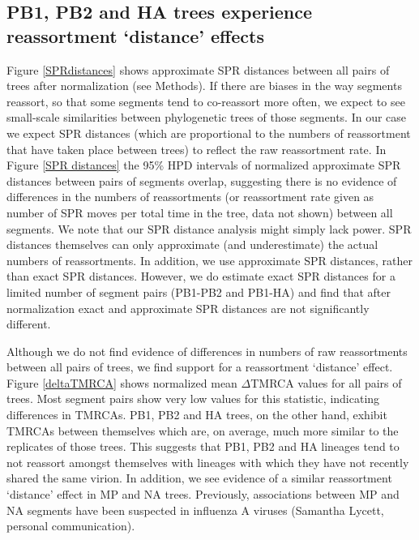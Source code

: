 \documentclass[11pt,oneside,letterpaper]{article}
\begin{document}
\subsection*{PB1, PB2 and HA trees experience reassortment `distance' effects}
Figure \ref{SPRdistances} shows approximate SPR distances between all pairs of trees after normalization (see Methods).
If there are biases in the way segments reassort, so that some segments tend to co-reassort more often, we expect to see small-scale similarities between phylogenetic trees of those segments.
In our case we expect SPR distances (which are proportional to the numbers of reassortment that have taken place between trees) to reflect the raw reassortment rate.
In Figure \ref{SPR distances} the 95\% HPD intervals of normalized approximate SPR distances between pairs of segments overlap, suggesting there is no evidence of differences in the numbers of reassortments (or reassortment rate given as number of SPR moves per total time in the tree, data not shown) between all segments.
We note that our SPR distance analysis might simply lack power.
SPR distances themselves can only approximate (and underestimate) the actual numbers of reassortments.
In addition, we use approximate SPR distances, rather than exact SPR distances.
However, we do estimate exact SPR distances for a limited number of segment pairs (PB1-PB2 and PB1-HA) and find that after normalization exact and approximate SPR distances are not significantly different. 

Although we do not find evidence of differences in numbers of raw reassortments between all pairs of trees, we find support for a reassortment `distance' effect.
Figure \ref{deltaTMRCA} shows normalized mean $\Delta$TMRCA values for all pairs of trees.
Most segment pairs show very low values for this statistic, indicating differences in TMRCAs.
PB1, PB2 and HA trees, on the other hand, exhibit TMRCAs between themselves which are, on average, much more similar to the replicates of those trees.
This suggests that PB1, PB2 and HA lineages tend to not reassort amongst themselves with lineages with which they have not recently shared the same virion.
In addition, we see evidence of a similar reassortment `distance' effect in MP and NA trees.
Previously, associations between MP and NA segments have been suspected in influenza A viruses (Samantha Lycett, personal communication).
\end{document}
